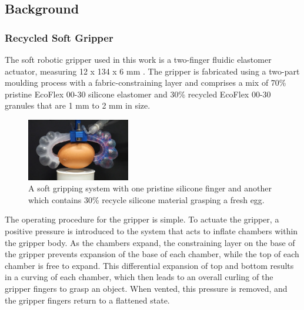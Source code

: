 \documentclass[letterpaper, 10 pt, conference]{ieeeconf}  %
\begin{document}
	\subsection{Background}\label{background}
	\subsubsection{Recycled Soft Gripper}
	The soft robotic gripper used in this work is a two-finger fluidic elastomer actuator, measuring 12 x 134 x 6 mm \cite{Partridge2022}. The gripper is fabricated using a two-part moulding process with a fabric-constraining layer and comprises a mix of 70\% pristine EcoFlex 00-30 silicone elastomer and 30\% recycled EcoFlex 00-30 granules that are 1 mm to 2 mm in size.%
	
	\begin{figure}
		\centering
		\includegraphics[width=0.4\textwidth]{figures/recycledsoftgripper.jpg}%
		\caption{A soft gripping system with one pristine silicone finger and another which contains 30\% recycle silicone material grasping a fresh egg.}
		\label{gripper}
	\end{figure}
	
	The operating procedure for the gripper is simple. To actuate the gripper, a positive pressure is introduced to the system that acts to inflate chambers within the gripper body. As the chambers expand, the constraining layer on the base of the gripper prevents expansion of the base of each chamber, while the top of each chamber is free to expand. This differential expansion of top and bottom results in a curving of each chamber, which then leads to an overall curling of the gripper fingers to grasp an object. When vented, this pressure is removed, and the gripper fingers return to a flattened state. 
	
\end{document}
